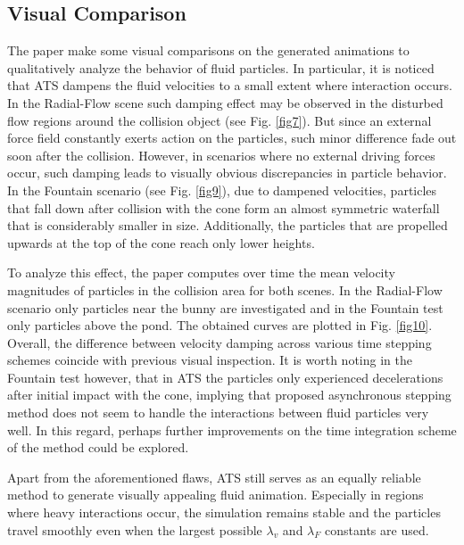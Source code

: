 \documentclass[
	11pt, 
	DIV10,
	ngerman,
	a4paper, 
	oneside, 
	headings=normal, 
	captions=tableheading,
	final, 
	numbers=noenddot
]{scrartcl}
\begin{document}
\subsection{Visual Comparison}
The paper make some visual comparisons on the generated animations to qualitatively analyze the behavior of fluid particles. In particular, it is noticed that ATS dampens the fluid velocities to a small extent where interaction occurs. In the Radial-Flow scene such damping effect may be observed in the disturbed flow regions around the collision object (see Fig. \ref{fig7}). But since an external force field constantly exerts action on the particles, such minor difference fade out soon after the collision. However, in scenarios where no external driving forces occur, such damping leads to visually obvious discrepancies in particle behavior. In the Fountain scenario (see Fig. \ref{fig9}), due to dampened velocities, particles that fall down after collision with the cone form an almost symmetric waterfall that is considerably smaller in size. Additionally, the particles that are propelled upwards at the top of the cone reach only lower heights.
\par
To analyze this effect, the paper computes over time the mean velocity magnitudes of particles in the collision area for both scenes. In the Radial-Flow scenario only particles near the bunny are investigated and in the Fountain test only particles above the pond. The obtained curves are plotted in Fig. \ref{fig10}. Overall, the difference between velocity damping across various time stepping schemes coincide with previous visual inspection. It is worth noting in the Fountain test however, that in ATS the particles only experienced decelerations after initial impact with the cone, implying that proposed asynchronous stepping method does not seem to handle the interactions between fluid particles very well. In this regard, perhaps further improvements on the time integration scheme of the method could be explored.
\par
Apart from the aforementioned flaws, ATS still serves as an equally reliable method to generate visually appealing fluid animation. Especially in regions where heavy interactions occur, the simulation remains stable and the particles travel smoothly even when the largest possible $ \lambda_{v} $ and $ \lambda_{F} $ constants are used.
\end{document}
